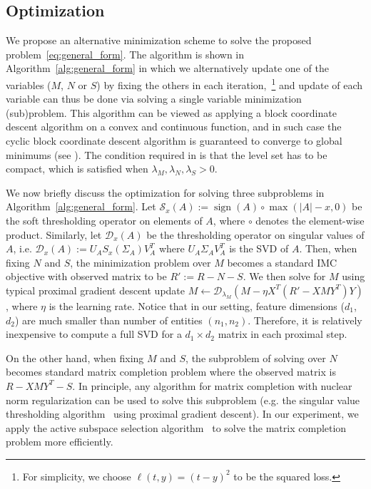 \documentclass[twoside,11pt]{article}
\newcommand\sgn[1]{{\operatorname{sign}}(#1)}  %
\begin{document}
\subsection{Optimization}
\label{subsec:optimization}
We propose an alternative minimization scheme to solve the proposed
problem~\eqref{eq:general_form}.
The algorithm is shown in Algorithm~\ref{alg:general_form}
in which we alternatively update
one of the variables ($M$, $N$ or $S$) by fixing the others in each iteration,~\footnote{For
simplicity, we choose $\ell(t, y) = (t-y)^2$ to be the squared loss.}
and update of each variable can thus be done via solving a single variable minimization (sub)problem.
This algorithm can be viewed as
applying a block coordinate descent algorithm on a convex and continuous function,
and
in such case the cyclic block coordinate descent algorithm is guaranteed to
converge to global minimums (see \citealp{tseng2001convergence}).
The condition required in \cite{tseng2001convergence} is that the level set has to be compact,
which is satisfied when
$\lambda_M, \lambda_N, \lambda_S>0$.

We now briefly discuss the optimization for solving three subproblems in Algorithm~\ref{alg:general_form}.
Let ${\mathcal S}_x(A) := \sgn{A} \circ \max(|A|-x, 0)$ be the soft thresholding operator on
elements of $A$, where $\circ$ denotes the element-wise product.  Similarly, let
${\mathcal D}_x(A)$ be the thresholding operator on singular values of $A$, i.e.
${\mathcal D}_x(A) := U_A S_x(\Sigma_A)V_A^T$ where $U_A\Sigma_A V_A^T$ is the SVD of $A$.  Then,
when fixing $N$ and $S$, the minimization problem over $M$ becomes
a standard IMC objective with observed matrix to be $R' := R-N-S$.
We then solve for $M$ using typical proximal gradient descent update
$M \leftarrow {\mathcal D}_{\lambda_M}(M-\eta X^T(R'-XMY^T)Y)$, where
$\eta$ is the learning rate.
Notice that in our setting, feature dimensions ($d_1$, $d_2$)
are much smaller than number of entities $(n_1, n_2)$.  Therefore, it is relatively inexpensive to
compute a full SVD for a $d_1\times d_2$ matrix in each proximal step.

On the other hand, when fixing $M$ and $S$,
the subproblem of solving over $N$ becomes standard matrix completion problem
where the observed matrix is $R-XMY^T-S$.
In principle, any algorithm for matrix completion with nuclear norm regularization
can be used to solve this subproblem
(e.g. the singular value thresholding algorithm~\citep{Cai10a} using proximal gradient descent).
In our experiment,
we apply the active subspace selection algorithm~\citep{Hsieh14a} to solve
the matrix completion problem more efficiently.
\end{document}
